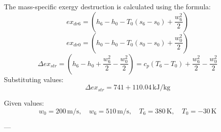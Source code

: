 The mass-specific exergy destruction is calculated using the formula:  
\[
ex_{dr6} = (h_6 - h_0 - T_0(s_6 - s_0) + \frac{w_6^2}{2})
\]  
\[
ex_{dr0} = (h_0 - h_0 - T_0(s_0 - s_0) + \frac{w_0^2}{2})
\]  
\[
\Delta ex_{str} = (h_6 - h_0 + \frac{w_6^2}{2} - \frac{w_0^2}{2}) = c_p(T_6 - T_0) + \frac{w_6^2}{2} - \frac{w_0^2}{2}
\]  
Substituting values:  
\[
\Delta ex_{str} = 741 + 110.04 \, \text{kJ/kg}
\]  

Given values:  
\[
w_0 = 200 \, \text{m/s}, \quad w_6 = 510 \, \text{m/s}, \quad T_6 = 380 \, \text{K}, \quad T_0 = -30 \, \text{K}
\]  

---
